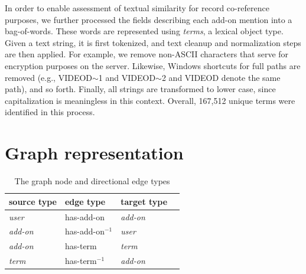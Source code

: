 \documentclass[11pt,oneside]{book}
\let\Oldsection\section
\renewcommand{\section}{\FloatBarrier\Oldsection}
\begin{document}
In order to enable assessment of textual similarity for record co-reference purposes, we further processed the fields describing each add-on mention into a bag-of-words. These words are represented using {\it terms}, a lexical object type. Given a text string, it is first tokenized, and text cleanup and normalization steps are then applied. For example, we remove non-ASCII characters that serve for encryption purposes on the server. Likewise,  Windows shortcuts for full paths are removed (e.g., VIDEOD$\sim$1 and VIDEOD$\sim$2 and VIDEOD denote the same path), and so forth. Finally, all strings are transformed to lower case, since capitalization is meaningless in this context. Overall, 167,512 unique terms were identified in this process.


\section{Graph representation}

\begin{table}[t]
\begin{center}
\begin{small}
\begin{tabular}{llll}
\hline 
\textbf{source type} & \textbf{edge type} & \textbf{target type} \\
\hline
{\it user} & has-add-on & {\it add-on} \\
\hline
{\it add-on} &  has-add-on$^{-1}$ & {\it user} \\
{\it add-on} & has-term & {\it term} \\
\hline
{\it term} & has-term$^{-1}$ & {\it add-on} \\
\hline
\end{tabular}
\end{small}
\end{center}
\caption{\label{tab:graph_structure} The graph node and directional edge types}
\end{table}
\end{document}
